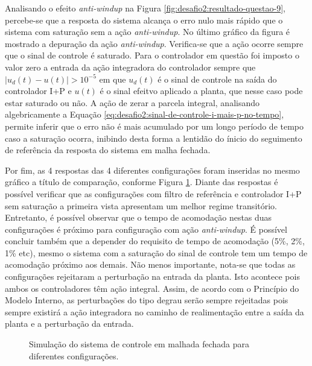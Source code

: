 Analisando o efeito \textit{anti-windup} na Figura
\ref{fig:desafio2:resultado-questao-9}, percebe-se que a resposta do sistema
alcança o erro nulo mais rápido que o sistema com saturação sem a ação
\textit{anti-windup}. No último gráfico da figura é mostrado a depuração da ação
\textit{anti-windup}. Verifica-se que a ação ocorre sempre que o sinal de
controle é saturado. Para o controlador em questão foi imposto o valor zero a
entrada da ação integradora do controlador sempre que $|u_{d}(t) - u(t)| >
10^{-5}$ em que $u_{d}(t)$ é o sinal de controle na saída do controlador I+P e
$u(t)$ é o sinal efeitvo aplicado a planta, que nesse caso pode estar saturado
ou não. A ação de zerar a parcela integral, analisando algebricamente a Equação
\ref{eq:desafio2:sinal-de-controle-i-mais-p-no-tempo}, permite inferir que o erro
não é mais acumulado por um longo período de tempo caso a saturação ocorra,
inibindo desta forma a lentidão do ínicio do seguimento de referência da
resposta do sistema em malha fechada.

Por fim, as 4 respostas das 4 diferentes configurações foram inseridas no mesmo
gráfico a título de comparação, conforme Figura
\ref{fig:desafio2:resultado-questao-6-9}. Diante das respostas é possível
verificar que as configurações com filtro de referência e controlador I+P sem
saturação a primeira vista apresentam um melhor regime transitório. Entretanto,
é possível observar que o tempo de acomodação nestas duas configurações é
próximo para configuração com ação \textit{anti-windup}. É possível concluir
também que a depender do requisito de tempo de acomodação (5\%, 2\%, 1\% etc),
mesmo o sistema com a saturação do sinal de controle tem um tempo de acomodação
próximo aos demais. Não menos importante, nota-se que todas as configurações
rejeitaram a perturbação na entrada da planta. Isto acontece pois ambos os
controladores têm ação integral. Assim, de acordo com o Princípio do Modelo
Interno, as perturbações do tipo degrau serão sempre rejeitadas pois sempre
existirá a ação integradora no caminho de realimentação entre a saída da planta
e a perturbação da entrada.

\begin{figure}[!ht]
    \caption{Simulação do sistema de controle em malhada fechada para diferentes
    configurações.}
    \vspace{-10pt}
    \hspace{-30pt}
    \label{fig:desafio2:resultado-questao-6-9}
    \begin{minipage}{\linewidth}
        
    \end{minipage}
\end{figure}

